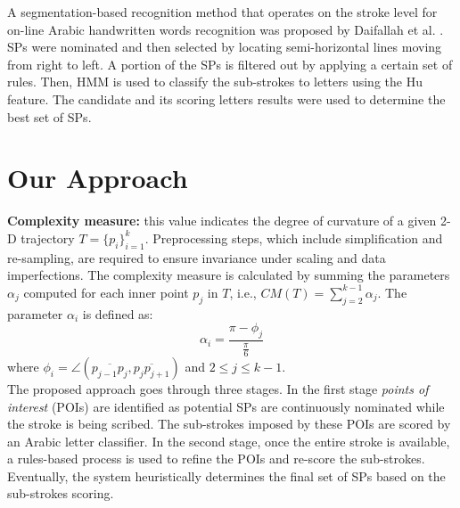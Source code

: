 \documentclass[10pt, conference, compsocconf]{IEEEtran}
\begin{document}
A segmentation-based recognition method that operates on the stroke level for on-line Arabic handwritten words recognition was proposed by Daifallah et al. \cite{daifallah2009recognition}. 
SPs were nominated and then selected by locating semi-horizontal lines moving from right to left. 
A portion of the SPs is filtered out by applying a certain set of rules. 
Then, HMM is used to classify the sub-strokes to letters using the Hu feature. 
The candidate and its scoring letters results were used to determine the best set of SPs.\\


\section{Our Approach}
\label{sec:approach}

\textbf{Complexity measure:} this value indicates the degree of curvature of a given 2-D trajectory $T=\{p_i\}_{i=1}^{k}$. 
Preprocessing steps, which include simplification and re-sampling, are required to ensure invariance under scaling and data imperfections. 
The complexity measure is calculated by summing the parameters $\alpha_{j}$ computed for each inner point $p_j$ in $T$, i.e., $CM(T)=\sum_{j=2}^{k-1}{\alpha_j}$.
The parameter $\alpha_{i}$ is defined as:
\begin{equation}
\alpha_{i}=\frac{\pi-\phi_{j}}{\frac{\pi}{6}}
\end{equation}
where $\phi_i=\angle(\overline{p_{j-1}p_{j}},\overline{p_{j}p_{j+1}})$ and $2\leq j \leq k-1$.\\

The proposed approach goes through three stages. 
In the first stage \emph{points of interest} (POIs) are identified as potential SPs are continuously nominated while the stroke is being scribed. 
The sub-strokes imposed by these POIs are scored by an Arabic letter classifier. 
In the second stage, once the entire stroke is available, a rules-based process is used to refine the POIs and re-score the sub-strokes. 
Eventually, the system heuristically determines the final set of SPs based on the sub-strokes scoring.\\
\end{document}
